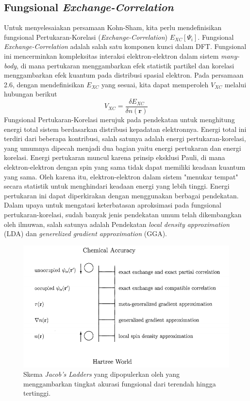 \subsection{Fungsional \textit{Exchange-Correlation}}
Untuk menyelesaiakan persamaan Kohn-Sham, kita perlu mendefinisikan fungsional Pertukaran-Korelasi (\textit{Exchange-Correlation}) $E_{XC}[\Psi_i]$. Fungsional \textit{Exchange-Correlation} adalah salah satu komponen kunci dalam DFT. Fungsional ini mencerminkan kompleksitas interaksi elektron-elektron dalam sistem \textit{many-body}, di mana pertukaran menggambarkan efek statistik partikel dan korelasi menggambarkan efek kuantum pada distribusi spasial elektron. Pada persamaan 2.6, dengan mendefinisikan $E_{XC}$ yang sesuai, kita dapat memperoleh $V_{XC}$ melalui hubungan berikut
\begin{equation}
V_{XC}=\frac{\delta E_{XC}}{\delta n(\mathbf{r})}
\end{equation}
Fungsional Pertukaran-Korelasi merujuk pada pendekatan untuk menghitung energi total sistem berdasarkan distribusi kepadatan elektronnya. Energi total ini terdiri dari beberapa kontribusi, salah satunya adalah energi pertukaran-korelasi, yang umumnya dipecah menjadi dua bagian yaitu energi pertukaran dan energi korelasi. Energi pertukaran muncul karena prinsip eksklusi Pauli, di mana elektron-elektron dengan spin yang sama tidak dapat memiliki keadaan kuantum yang sama. Oleh karena itu, elektron-elektron dalam sistem "menukar tempat" secara statistik untuk menghindari keadaan energi yang lebih tinggi. Energi pertukaran ini dapat diperkirakan dengan menggunakan berbagai pendekatan.
Dalam upaya untuk mengatasi keterbatasan aproksimasi pada fungsional pertukaran-korelasi, sudah banyak jenis pendekatan umum telah dikembangkan oleh ilmuwan, salah satunya adalah Pendekatan \textit{local density approximation} (LDA) dan \textit{generelized gradient approximation} (GGA).

\begin{figure}
    \centering
    \includegraphics[width=12cm]{./gambar/tangga yakub.png}
    \caption{Skema \textit{Jacob's Ladders} yang dipopulerkan oleh \citeauthor{Perdew} yang menggambarkan tingkat akurasi fungsional dari terendah hingga tertinggi.}
    \label{fig:kpoints}
\end{figure}

